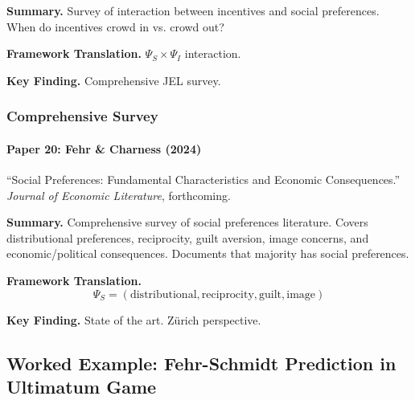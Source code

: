 \textbf{Summary.}
Survey of interaction between incentives and social preferences.
When do incentives crowd in vs. crowd out?

\textbf{Framework Translation.}
$\Psi_S \times \Psi_I$ interaction.

\textbf{Key Finding.}
Comprehensive JEL survey.

\subsubsection{Comprehensive Survey}

\paragraph{Paper 20: Fehr \& Charness (2024)}

``Social Preferences: Fundamental Characteristics and Economic Consequences.''
\textit{Journal of Economic Literature}, forthcoming.

\textbf{Summary.}
Comprehensive survey of social preferences literature. Covers 
distributional preferences, reciprocity, guilt aversion, image concerns, 
and economic/political consequences. Documents that majority has 
social preferences.

\textbf{Framework Translation.}
\begin{equation}
\Psi_S = (\text{distributional}, \text{reciprocity}, \text{guilt}, \text{image})
\end{equation}

\textbf{Key Finding.}
State of the art. Zürich perspective.

\subsection{Worked Example: Fehr-Schmidt Prediction in Ultimatum Game}
\label{sec:aj-worked-example}


